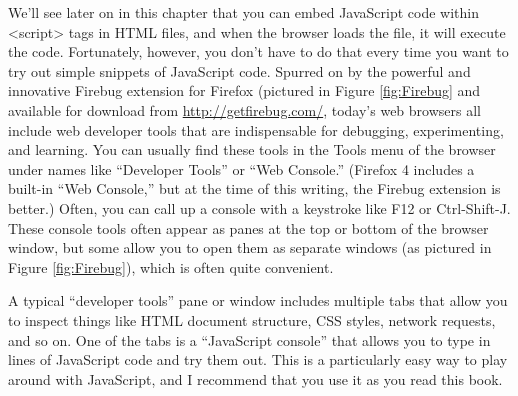 We’ll see later on in this chapter that you can embed JavaScript code within <script>
tags in HTML files, and when the browser loads the file, it will execute the code. Fortunately,
however, you don’t have to do that every time you want to try out simple
snippets of JavaScript code. Spurred on by the powerful and innovative Firebug extension
for Firefox (pictured in Figure \ref{fig:Firebug} and available for download from \href{http://getfirebug.com/}{http://getfirebug.com/}, today’s web browsers all include web developer tools that are indispensable for
debugging, experimenting, and learning. You can usually find these tools in the Tools
menu of the browser under names like “Developer Tools” or “Web Console.”
(Firefox 4 includes a built-in “Web Console,” but at the time of this writing, the Firebug
extension is better.) Often, you can call up a console with a keystroke like F12 or Ctrl-Shift-J.
These console tools often appear as panes at the top or bottom of the browser
window, but some allow you to open them as separate windows (as pictured in Figure
\ref{fig:Firebug}), which is often quite convenient.


A typical “developer tools” pane or window includes multiple tabs that allow you to
inspect things like HTML document structure, CSS styles, network requests, and so
on. One of the tabs is a “JavaScript console” that allows you to type in lines of JavaScript
code and try them out. This is a particularly easy way to play around with JavaScript,
and I recommend that you use it as you read this book.

